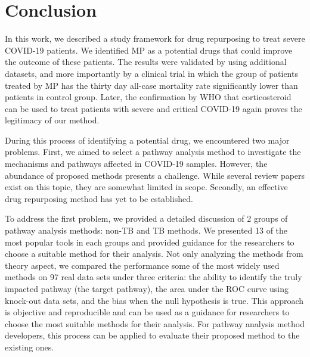 \section{Conclusion}

In this work, we described a study framework for drug repurposing to treat severe COVID-19 patients. We identified MP as a potential drugs that could improve the outcome of these patients. The results were validated by using additional datasets, and more importantly by a clinical trial in which the group of patients treated by MP has the thirty day all-case mortality rate significantly lower than patients in control group. Later, the confirmation by WHO that corticosteroid can be used to treat patients with severe and critical COVID-19 again proves the legitimacy of our method.

During this process of identifying a potential drug, we encountered two major problems. First, we aimed to select a pathway analysis method to investigate the mechanisms and pathways affected in COVID-19 samples. However, the abundance of proposed methods presents a challenge. While several review papers exist on this topic, they are somewhat limited in scope. Secondly, an effective drug repurposing method has yet to be established.

To address the first problem, we provided a detailed discussion of 2 groups of pathway analysis methods: non-TB and TB methods. We presented 13 of the most popular tools in each groups and provided guidance for the researchers to choose a suitable method for their analysis. Not only analyzing the methods from theory aspect, we compared the performance some of the most widely used methods on 97 real data sets under three criteria: the ability to identify the truly impacted pathway (the target pathway), the area under the ROC curve using knock-out data sets, and the bias when the null hypothesis is true. This approach is objective and reproducible and can be used as a guidance for researchers to choose the most suitable methods for their analysis. For pathway analysis method developers, this process can be applied to evaluate their proposed method to the existing ones. 


